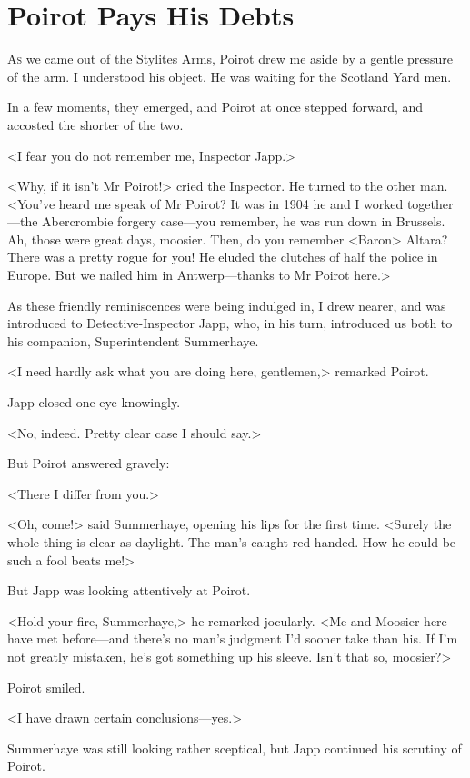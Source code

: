 \chapter{Poirot Pays His Debts} 

\lettrine{A}{s} we came out of the Stylites Arms, Poirot drew me aside by a gentle pressure of the arm. I understood his object. He was waiting for the Scotland Yard men. 

\zz
 In a few moments, they emerged, and Poirot at once stepped forward, and accosted the shorter of the two. 

 <I fear you do not remember me, Inspector Japp.> 

 <Why, if it isn't Mr Poirot!> cried the Inspector. He turned to the other man. <You've heard me speak of Mr Poirot? It was in 1904 he and I worked together—the Abercrombie forgery case—you remember, he was run down in Brussels. Ah, those were great days, moosier. Then, do you remember <Baron> Altara? There was a pretty rogue for you! He eluded the clutches of half the police in Europe. But we nailed him in Antwerp—thanks to Mr Poirot here.> 

 As these friendly reminiscences were being indulged in, I drew nearer, and was introduced to Detective-Inspector Japp, who, in his turn, introduced us both to his companion, Superintendent Summerhaye. 

 <I need hardly ask what you are doing here, gentlemen,> remarked Poirot. 

 Japp closed one eye knowingly. 

 <No, indeed. Pretty clear case I should say.> 

 But Poirot answered gravely: 

 <There I differ from you.> 

 <Oh, come!> said Summerhaye, opening his lips for the first time. <Surely the whole thing is clear as daylight. The man's caught red-handed. How he could be such a fool beats me!> 

 But Japp was looking attentively at Poirot. 

 <Hold your fire, Summerhaye,> he remarked jocularly. <Me and Moosier here have met before—and there's no man's judgment I'd sooner take than his. If I'm not greatly mistaken, he's got something up his sleeve. Isn't that so, moosier?> 

 Poirot smiled. 

 <I have drawn certain conclusions—yes.> 

 Summerhaye was still looking rather sceptical, but Japp continued his scrutiny of Poirot. 

